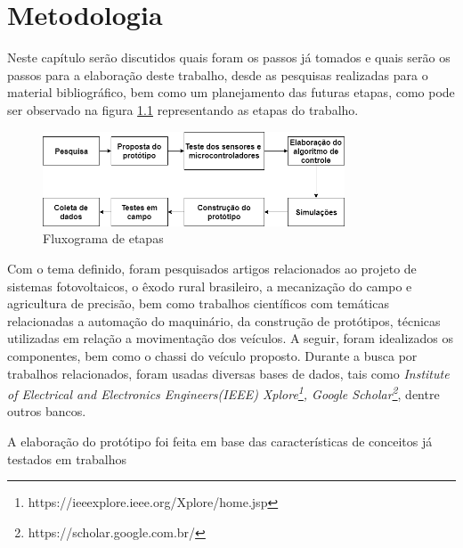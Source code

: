 \chapter{Metodologia}
\label{cap:metodologia}
Neste capítulo serão discutidos quais foram os passos já tomados e quais serão os passos para a elaboração deste trabalho, desde as pesquisas realizadas para o material bibliográfico, bem como um planejamento das futuras etapas, como pode ser observado na figura \ref{fig:metodologia:etapas} representando as etapas do trabalho. 

\begin{figure}[H]
    \centering
    \includegraphics[width=0.8\textwidth]{figuras/metodologia.png}
    \caption{Fluxograma de etapas}
    \label{fig:metodologia:etapas}
\end{figure}

Com o tema definido, foram pesquisados artigos relacionados ao projeto de sistemas fotovoltaicos, o êxodo rural brasileiro, a mecanização do campo e agricultura de precisão, bem como trabalhos científicos com temáticas relacionadas a automação do  maquinário, da construção de protótipos, técnicas utilizadas em relação a movimentação dos veículos. A seguir, foram idealizados os componentes, bem como o chassi do veículo proposto. Durante a busca por trabalhos relacionados, foram usadas diversas bases de dados, tais como  \textit{Institute of Electrical and Electronics Engineers(IEEE) Xplore\footnote{https://ieeexplore.ieee.org/Xplore/home.jsp}, Google Scholar\footnote{https://scholar.google.com.br/}}, dentre outros bancos. 

A elaboração do protótipo foi feita em base das características de conceitos já testados em trabalhos